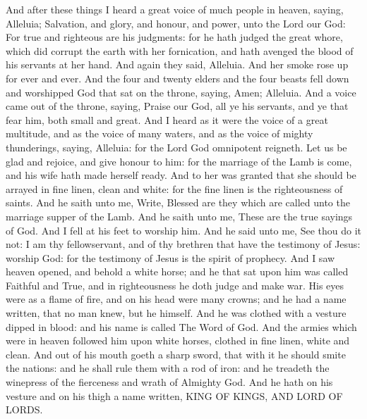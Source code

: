  And after these things I heard a great voice of much
people in heaven, saying, Alleluia; Salvation, and glory, and honour,
and power, unto the Lord our God:  For true and righteous
are his judgments: for he hath judged the great whore, which did corrupt
the earth with her fornication, and hath avenged the blood of his
servants at her hand.  And again they said, Alleluia. And
her smoke rose up for ever and ever.  And the four and
twenty elders and the four beasts fell down and worshipped God that sat
on the throne, saying, Amen; Alleluia.  And a voice came
out of the throne, saying, Praise our God, all ye his servants, and ye
that fear him, both small and great.  And I heard as it
were the voice of a great multitude, and as the voice of many waters,
and as the voice of mighty thunderings, saying, Alleluia: for the Lord
God omnipotent reigneth.  Let us be glad and rejoice, and
give honour to him: for the marriage of the Lamb is come, and his wife
hath made herself ready.  And to her was granted that she
should be arrayed in fine linen, clean and white: for the fine linen is
the righteousness of saints.  And he saith unto me, Write,
Blessed are they which are called unto the marriage supper of the Lamb.
And he saith unto me, These are the true sayings of God. 
And I fell at his feet to worship him. And he said unto me, See thou do
it not: I am thy fellowservant, and of thy brethren that have the
testimony of Jesus: worship God: for the testimony of Jesus is the
spirit of prophecy.  And I saw heaven opened, and behold
a white horse; and he that sat upon him was called Faithful and True,
and in righteousness he doth judge and make war.  His
eyes were as a flame of fire, and on his head were many crowns; and he
had a name written, that no man knew, but he himself. 
And he was clothed with a vesture dipped in blood: and his name is
called The Word of God.  And the armies which were in
heaven followed him upon white horses, clothed in fine linen, white and
clean.  And out of his mouth goeth a sharp sword, that
with it he should smite the nations: and he shall rule them with a rod
of iron: and he treadeth the winepress of the fierceness and wrath of
Almighty God.  And he hath on his vesture and on his
thigh a name written, KING OF KINGS, AND LORD OF LORDS.


